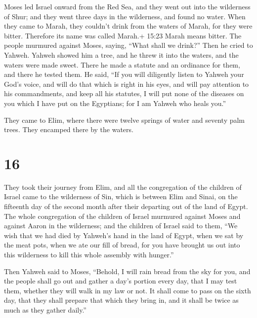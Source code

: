  Moses led Israel onward from the Red Sea, and they went
out into the wilderness of Shur; and they went three days in the
wilderness, and found no water.  When they came to Marah,
they couldn't drink from the waters of Marah, for they were bitter.
Therefore its name was called Marah.+ 15:23 Marah means bitter.
 The people murmured against Moses, saying, ``What shall we
drink?''  Then he cried to Yahweh. Yahweh showed him a
tree, and he threw it into the waters, and the waters were made sweet.
There he made a statute and an ordinance for them, and there he tested
them.  He said, ``If you will diligently listen to Yahweh
your God's voice, and will do that which is right in his eyes, and will
pay attention to his commandments, and keep all his statutes, I will put
none of the diseases on you which I have put on the Egyptians; for I am
Yahweh who heals you.''

 They came to Elim, where there were twelve springs of
water and seventy palm trees. They encamped there by the waters.

\hypertarget{section-15}{%
\section{16}\label{section-15}}

 They took their journey from Elim, and all the congregation
of the children of Israel came to the wilderness of Sin, which is
between Elim and Sinai, on the fifteenth day of the second month after
their departing out of the land of Egypt.  The whole
congregation of the children of Israel murmured against Moses and
against Aaron in the wilderness;  and the children of Israel
said to them, ``We wish that we had died by Yahweh's hand in the land of
Egypt, when we sat by the meat pots, when we ate our fill of bread, for
you have brought us out into this wilderness to kill this whole assembly
with hunger.''

 Then Yahweh said to Moses, ``Behold, I will rain bread from
the sky for you, and the people shall go out and gather a day's portion
every day, that I may test them, whether they will walk in my law or
not.  It shall come to pass on the sixth day, that they
shall prepare that which they bring in, and it shall be twice as much as
they gather daily.''

